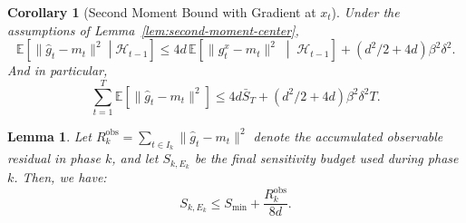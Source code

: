 \documentclass[10pt,a4paper]{amsart}
\newtheorem{lemma}{Lemma}
\newtheorem{corollary}{Corollary}
\begin{document}
\begin{corollary}[Second Moment Bound with Gradient at $x_{t}$]
    \label{cor:second-moment-play} Under the assumptions of Lemma~\ref{lem:second-moment-center},
    \begin{equation*}
        \mathbb{E}\left[\|\hat g_{t}-m_{t}\|^{2}\middle| \mathcal{H}_{t-1}\right
        ] \le 4d\,\mathbb{E}\left[\|g_{t}^{x}-m_{t}\|^{2}\;\middle|\; \mathcal{H}
        _{t-1}\right] + (d^{2}/2+4d)\beta^{2}\delta^{2}.
    \end{equation*}
    And in particular,
    \begin{equation*}
        \sum_{t=1}^{T}\mathbb{E}\left[\|\hat g_{t}-m_{t}\|^{2}\right]\le 4d\bar S
        _{T}+ (d^{2}/2+4d)\beta^{2}\delta^{2}T.
    \end{equation*}
\end{corollary}

\begin{lemma}
    \label{lem:finalS-phase} Let $R^{\mathrm{obs}}_{k}= \sum_{t\in I_k}\|\hat g
    _{t}-m_{t}\|^{2}$ denote the accumulated observable residual in phase $k$,
    and let $S_{k,E_k}$ be the final sensitivity budget used during phase $k$. Then, we have:
    \begin{equation*}
        S_{k,E_k}\le S_{\min} + \frac{R^{\mathrm{obs}}_{k}}{8d}.
    \end{equation*}
\end{lemma}
\end{document}

